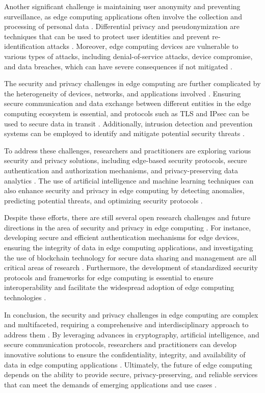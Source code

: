 \documentclass[11pt,a4paper]{article}
\begin{document}
Another significant challenge is maintaining user anonymity and preventing surveillance, as edge computing applications often involve the collection and processing of personal data \cite{arxiv:2004.07311}. Differential privacy and pseudonymization are techniques that can be used to protect user identities and prevent re-identification attacks \cite{arxiv:1911.02794}. Moreover, edge computing devices are vulnerable to various types of attacks, including denial-of-service attacks, device compromise, and data breaches, which can have severe consequences if not mitigated \cite{arxiv:1811.11268}.

The security and privacy challenges in edge computing are further complicated by the heterogeneity of devices, networks, and applications involved \cite{arxiv:1810.00305}. Ensuring secure communication and data exchange between different entities in the edge computing ecosystem is essential, and protocols such as TLS and IPsec can be used to secure data in transit \cite{arxiv:1906.11056}. Additionally, intrusion detection and prevention systems can be employed to identify and mitigate potential security threats \cite{arxiv:2107.13374}.

To address these challenges, researchers and practitioners are exploring various security and privacy solutions, including edge-based security protocols, secure authentication and authorization mechanisms, and privacy-preserving data analytics \cite{arxiv:2109.12195}. The use of artificial intelligence and machine learning techniques can also enhance security and privacy in edge computing by detecting anomalies, predicting potential threats, and optimizing security protocols \cite{arxiv:1809.00343}.

Despite these efforts, there are still several open research challenges and future directions in the area of security and privacy in edge computing \cite{arxiv:1712.04980}. For instance, developing secure and efficient authentication mechanisms for edge devices, ensuring the integrity of data in edge computing applications, and investigating the use of blockchain technology for secure data sharing and management are all critical areas of research \cite{arxiv:2106.10063}. Furthermore, the development of standardized security protocols and frameworks for edge computing is essential to ensure interoperability and facilitate the widespread adoption of edge computing technologies \cite{arxiv:2209.14141}.

In conclusion, the security and privacy challenges in edge computing are complex and multifaceted, requiring a comprehensive and interdisciplinary approach to address them \cite{arxiv:2309.03420}. By leveraging advances in cryptography, artificial intelligence, and secure communication protocols, researchers and practitioners can develop innovative solutions to ensure the confidentiality, integrity, and availability of data in edge computing applications \cite{arxiv:2310.03908}. Ultimately, the future of edge computing depends on the ability to provide secure, privacy-preserving, and reliable services that can meet the demands of emerging applications and use cases \cite{arxiv:2502.11644}.
\end{document}
